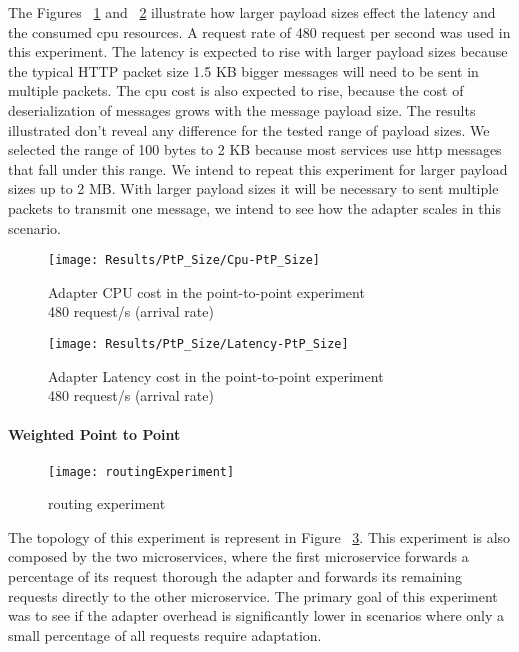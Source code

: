 The Figures  ~\ref{fig:payloadCpuPtP} and ~\ref{fig:payloadLatPtP} illustrate how larger payload sizes effect the latency and the consumed cpu resources.
A request rate of 480 request per second was used in this experiment.
The latency is expected to rise with larger payload sizes because the typical HTTP packet size 1.5 KB bigger messages will need to be sent in multiple packets.
The cpu cost is also expected to rise, because the cost of deserialization of messages grows with the message payload size.
The results illustrated don't reveal any difference for the tested range of payload sizes.
We selected the range of 100 bytes to 2 KB because most services use http messages that fall under this range.
We intend to repeat this experiment for larger payload sizes up to 2 MB.
With larger payload sizes it will be necessary to sent multiple packets to transmit one message, we intend to see how the adapter scales in this scenario.


\begin{figure}[htbp]
    \centering
    \texttt{[image: Results/PtP\_Size/Cpu-PtP\_Size]}
    \caption{Adapter CPU cost in the point-to-point experiment \\\hspace{\textwidth} 480 request/s (arrival rate)}
    \label{fig:payloadCpuPtP}
\end{figure}

\begin{figure}[htbp]
    \centering
    \texttt{[image: Results/PtP\_Size/Latency-PtP\_Size]}
    \caption{Adapter Latency cost in the point-to-point experiment \\\hspace{\textwidth} 480 request/s (arrival rate)}
    \label{fig:payloadLatPtP}
\end{figure}

\newpage

\paragraph{Weighted Point to Point}

\begin{figure}[htbp]
    \centering
    \texttt{[image: routingExperiment]}
    \caption{routing experiment}
    \label{fig:routExp}
\end{figure}

The topology of this experiment is represent in Figure ~\ref{fig:routExp}.
This experiment is also composed by the two microservices, where the first microservice forwards a percentage of its request thorough the adapter
and forwards its remaining requests directly to the other microservice.
The primary goal of this experiment was to see if the adapter overhead is significantly lower in scenarios where only a small percentage of all requests require adaptation.

